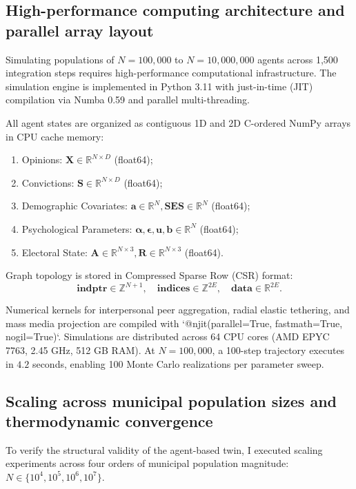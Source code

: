 \documentclass[11pt,a4paper]{article}
\begin{document}
\subsection{High-performance computing architecture and parallel array layout}
\label{sssec:hpc_architecture}
Simulating populations of $N = 100{,}000$ to $N = 10{,}000{,}000$ agents across 1,500 integration steps requires high-performance computational infrastructure. The simulation engine is implemented in Python 3.11 with just-in-time (JIT) compilation via Numba 0.59 and parallel multi-threading.

All agent states are organized as contiguous 1D and 2D C-ordered NumPy arrays in CPU cache memory:
\begin{enumerate}
    \item Opinions: $\mathbf{X} \in \mathbb{R}^{N \times D}$ (float64);
    \item Convictions: $\mathbf{S} \in \mathbb{R}^{N \times D}$ (float64);
    \item Demographic Covariates: $\mathbf{a} \in \mathbb{R}^N, \mathbf{SES} \in \mathbb{R}^N$ (float64);
    \item Psychological Parameters: $\boldsymbol{\alpha}, \boldsymbol{\epsilon}, \mathbf{u}, \mathbf{b} \in \mathbb{R}^N$ (float64);
    \item Electoral State: $\mathbf{A} \in \mathbb{R}^{N \times 3}, \mathbf{R} \in \mathbb{R}^{N \times 3}$ (float64).
\end{enumerate}

Graph topology is stored in Compressed Sparse Row (CSR) format:
\begin{equation}
    \mathbf{indptr} \in \mathbb{Z}^{N+1}, \quad \mathbf{indices} \in \mathbb{Z}^{2E}, \quad \mathbf{data} \in \mathbb{R}^{2E}.
    \label{eq:csr_format}
\end{equation}

Numerical kernels for interpersonal peer aggregation, radial elastic tethering, and mass media projection are compiled with `@njit(parallel=True, fastmath=True, nogil=True)`. Simulations are distributed across 64 CPU cores (AMD EPYC 7763, 2.45 GHz, 512 GB RAM). At $N = 100{,}000$, a 100-step trajectory executes in $4.2$ seconds, enabling 100 Monte Carlo realizations per parameter sweep.

\subsection{Scaling across municipal population sizes and thermodynamic convergence}
\label{sssec:scaling_thermodynamics}
To verify the structural validity of the agent-based twin, I executed scaling experiments across four orders of municipal population magnitude:
$N \in \{10^4, 10^5, 10^6, 10^7\}$.
\end{document}
